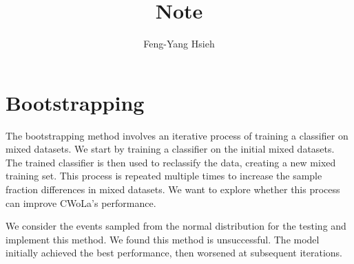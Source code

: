 \documentclass[12pt]{article}
\title{Note}
\author{Feng-Yang Hsieh}
\date{}
\begin{document}
\maketitle


\section{Bootstrapping}%
\label{sec:bootstrapping}
    The bootstrapping method involves an iterative process of training a classifier on mixed datasets. We start by training a classifier on the initial mixed datasets. The trained classifier is then used to reclassify the data, creating a new mixed training set. This process is repeated multiple times to increase the sample fraction differences in mixed datasets. We want to explore whether this process can improve CWoLa's performance.
    
    We consider the events sampled from the normal distribution for the testing and implement this method. We found this method is unsuccessful. The model initially achieved the best performance, then worsened at subsequent iterations.
\end{document}
